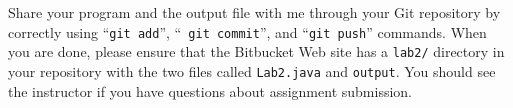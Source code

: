 Share your program and the output file with me through your Git repository by correctly using ``{\tt git add}'', ``{\tt
git commit}'', and ``{\tt git push}'' commands. When you are done, please ensure that the Bitbucket Web site has
a {\tt lab2/} directory in your repository with the two files called {\tt Lab2.java} and {\tt output}. You should see
the instructor if you have questions about assignment submission.


